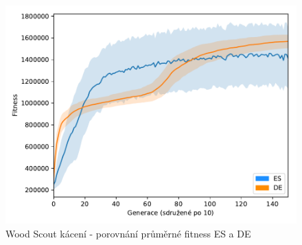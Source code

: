 	\begin{figure}[t]\centering
		\includegraphics[width=\columnwidth]{../img/WoodMap/DEvsES/WCuttorCutMem}
		\caption{Wood Scout kácení - porovnání průměrné fitness ES a DE}
		\label{obr04:CutESvsDE}
	\end{figure}
	\clearpage
	
